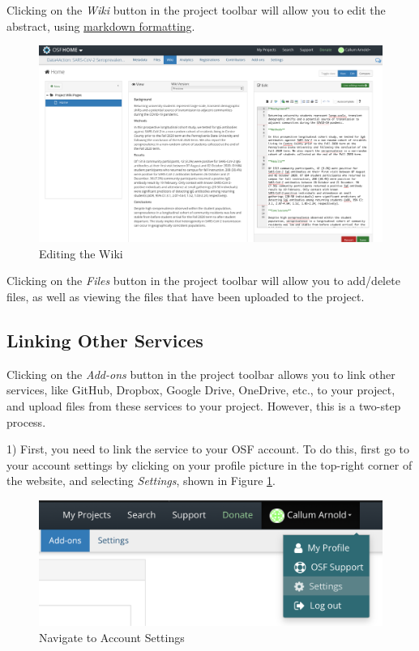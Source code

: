 \documentclass{scrartcl}
\begin{document}
Clicking on the \emph{Wiki} button in the project toolbar will allow you to edit the abstract, using \href{https://www.markdownguide.org/basic-syntax/}{markdown formatting}.

\begin{figure}[h]
    \includegraphics[width=\textwidth]{wiki-edit.png}
    \caption{Editing the Wiki}
\end{figure}

Clicking on the \emph{Files} button in the project toolbar will allow you to add/delete files, as well as viewing the files that have been uploaded to the project.

\subsection{Linking Other Services}

Clicking on the \emph{Add-ons} button in the project toolbar allows you to link other services, like GitHub, Dropbox, Google Drive, OneDrive, etc., to your project, and upload files from these services to your project.
However, this is a two-step process.

1) First, you need to link the service to your OSF account.
To do this, first go to your account settings by clicking on your profile picture in the top-right corner of the website, and selecting \emph{Settings}, shown in Figure \ref{fig:addons-account-settings-01}.

\begin{figure}[h]
    \centering
    \includegraphics[scale=0.5]{addons-account-settings-01.png}
    \caption{Navigate to Account Settings}
    \label{fig:addons-account-settings-01}
\end{figure}
\end{document}
